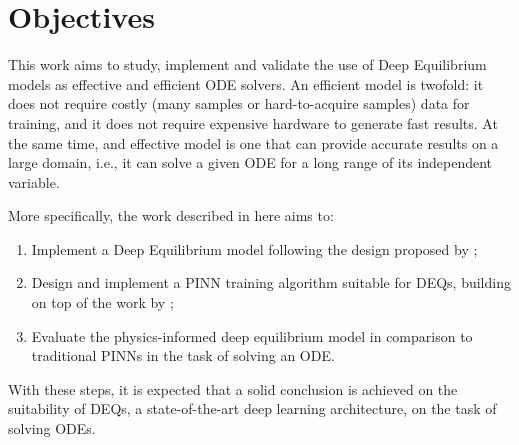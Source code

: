 

\section{Objectives}

This work aims to study, implement and validate the use of Deep Equilibrium models as effective and efficient \gls{ODE} solvers.
An efficient model is twofold: it does not require costly (many samples or hard-to-acquire samples) data for training, and it does not require expensive hardware to generate fast results.
At the same time, and effective model is one that can provide accurate results on a large domain, i.e., it can solve a given \gls{ODE} for a long range of its independent variable.

More specifically, the work described in here aims to:
\begin{enumerate}
    \item Implement a Deep Equilibrium model following the design proposed by \textcite{Bai2019};
    \item Design and implement a \gls{PINN} training algorithm suitable for \gls{DEQ}s, building on top of the work by \textcite{Raissi2019};
    \item Evaluate the physics-informed deep equilibrium model in comparison to traditional \gls{PINN}s in the task of solving an \gls{ODE}.
\end{enumerate}
With these steps, it is expected that a solid conclusion is achieved on the suitability of \gls{DEQ}s, a state-of-the-art deep learning architecture, on the task of solving \gls{ODE}s.



